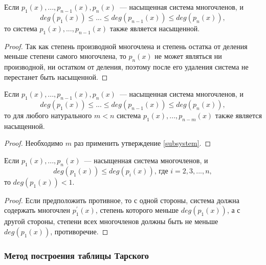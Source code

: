 \begin{proposal}\label{subsystem}\cite{lect1}
    Если $p_1(x), ... , p_{n-1}(x), p_n(x)$~--- насыщенная система многочленов, и 
    \begin{equation*}
        deg(p_1(x)) \leq ... \leq deg(p_{n-1}(x)) \leq deg(p_n(x)),
    \end{equation*}
    то система $p_1(x), ... , p_{n-1}(x)$ также является насыщенной.
\end{proposal}
\begin{proof}
    Так как степень производной многочлена и степень остатка от деления меньше степени самого многочлена, то $p_n(x)$ не может являться ни производной, ни остатком от деления, поэтому после его удаления система не перестанет быть насыщенной.
\end{proof}

\begin{proposal}\label{subsystem_1}\cite{lect1}
    Если $p_1(x), ... , p_{n-1}(x), p_n(x)$~--- насыщенная система многочленов, и 
    \begin{equation*}
        deg(p_1(x)) \leq ... \leq deg(p_{n-1}(x)) \leq deg(p_n(x)),
    \end{equation*}
    то для любого натурального $m < n$ система $p_1(x), ... , p_{n-m}(x)$ также является насыщенной.
\end{proposal}
\begin{proof}
    Необходимо $m$ раз применить утверждение \ref{subsystem}.
\end{proof}

\begin{proposal}\label{min deg}
    Если $p_1(x), ... , p_n(x)$~--- насыщенная система многочленов, и 
    \begin{equation*}
        deg(p_1(x)) \leq deg(p_i(x)),\,\text{где $i = 2, 3, ... , n$},
    \end{equation*}
    то $deg(p_1(x)) < 1$.
\end{proposal}
\begin{proof}
    Если предположить противное, то с одной стороны, система должна содержать многочлен $p_1^\prime(x)$, степень которого меньше $deg(p_1(x))$, а с другой стороны, степени всех многочленов должны быть не меньше $deg(p_1(x))$, противоречие.
\end{proof}

\subsubsection{Метод построения таблицы Тарского}

